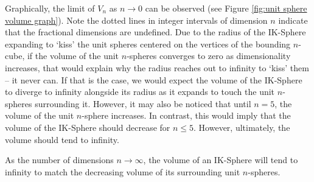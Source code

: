 Graphically, the limit of $V_n$ as $n \to 0$ can be observed (see Figure \ref{fig:unit sphere volume graph}). Note the dotted lines in integer intervals of dimension $n$ indicate that the fractional dimensions are undefined. Due to the radius of the IK-Sphere expanding to `kiss' the unit spheres centered on the vertices of the bounding $n$-cube, if the volume of the unit $n$-spheres converges to zero as dimensionality increases, that would explain why the radius reaches out to infinity to `kiss' them -- it never can. If that is the case, we would expect the volume of the IK-Sphere to diverge to infinity alongside its radius as it expands to touch the unit $n$-spheres surrounding it. However, it may also be noticed that until $n=5$, the volume of the unit $n$-sphere increases. In contrast, this would imply that the volume of the IK-Sphere should decrease for $n\leq 5$. However, ultimately, the volume should tend to infinity.

\begin{theorem}\label{theorem:volume of IK-Sphere}
As the number of dimensions $n \to \infty$, the volume of an IK-Sphere will tend to infinity to match the decreasing volume of its surrounding unit $n$-spheres. 
\end{theorem}


